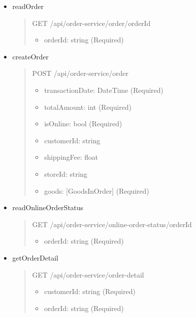 \begin{itemize}
	\item readOrder
	      \begin{quote}
		      GET /api/order-service/order/{orderId}
		      \begin{itemize}
			      \item orderId: string (Required)
		      \end{itemize}
	      \end{quote}

	\item createOrder
	      \begin{quote}
		      POST /api/order-service/order
		      \begin{itemize}
			      \item transactionDate: DateTime (Required)
			      \item totalAmount: int (Required)
			      \item isOnline: bool (Required)
			      \item customerId: string
			      \item shippingFee: float
			      \item storeId: string
			      \item goods: [GoodsInOrder] (Required)
		      \end{itemize}
	      \end{quote}

	\item readOnlineOrderStatus
	      \begin{quote}
		      GET /api/order-service/online-order-status/{orderId}
		      \begin{itemize}
			      \item orderId: string (Required)
		      \end{itemize}
	      \end{quote}

	\item getOrderDetail
	      \begin{quote}
		      GET /api/order-service/order-detail
		      \begin{itemize}
			      \item customerId: string (Required)
			      \item orderId: string (Required)
		      \end{itemize}
	      \end{quote}
\end{itemize}

